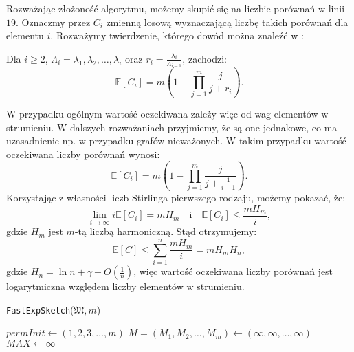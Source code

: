     Rozważając złożoność algorytmu, możemy skupić się na liczbie porównań w linii $19$. Oznaczmy przez $C_i$ zmienną losową wyznaczającą liczbę takich porównań dla elementu $i$. Rozważymy twierdzenie, którego dowód można znaleźć w \cite{Lemiesz_2023}:
    \begin{twierdzenie}
        \label{theo:avgComp}        
        Dla $i \geq 2$, $\Lambda_{i} = \lambda_{1}, \lambda_{2}, \dots, \lambda_{i}$ oraz $r_i = \frac{\lambda_{i}}{\Lambda_{i - 1}}$, zachodzi:
        \[
            \mathbb{E}[C_i] = m \left( 1 - \prod_{j = 1}^{m} \frac{j}{j + r_i} \right).   
        \]
    \end{twierdzenie}
    W przypadku ogólnym wartość oczekiwana zależy więc od wag elementów w strumieniu. W dalszych rozważaniach przyjmiemy, że są one jednakowe, co ma uzasadnienie np. w przypadku grafów nieważonych. W takim przypadku wartość oczekiwana liczby porównań wynosi: 
    \[
        \mathbb{E}[C_i] = m \left( 1 - \prod_{j = 1}^{m} \frac{j}{j + \frac{1}{i - 1}} \right) .
    \]
    Korzystając z własności liczb Stirlinga pierwszego rodzaju, możemy pokazać, że:
    \[
        \lim_{i \to \infty} i \mathbb{E}[C_i] = m H_m \quad \text{i} \quad \mathbb{E}[C_i] \leq \frac{m H_m}{i},
    \]
    gdzie $H_m$ jest $m$-tą liczbą harmoniczną. Stąd otrzymujemy:
    \[
        \mathbb{E}[C] \leq \sum\limits_{i = 1}^{n} \frac{m H_m}{i} = m H_m H_n,
    \]
    gdzie $H_n = \ln n + \gamma + O(\frac{1}{n})$, więc wartość oczekiwana liczby porównań jest logarytmiczna względem liczby elementów w strumieniu.

\begin{algorithm}
    \caption{\texttt{FastExpSketch}($\mathfrak{M}, m$)}\label{alg:fast_exp_sketch}
    $permInit \gets (1,2,3,\dots, m)$\;
    $M = (M_1, M_2, \dots, M_m) \gets (\infty, \infty, \dots, \infty)$\;
    $MAX \gets \infty$\;
\end{algorithm}

